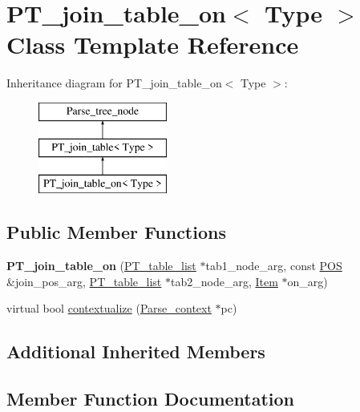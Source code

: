 \hypertarget{classPT__join__table__on}{}\section{P\+T\+\_\+join\+\_\+table\+\_\+on$<$ Type $>$ Class Template Reference}
\label{classPT__join__table__on}
Inheritance diagram for P\+T\+\_\+join\+\_\+table\+\_\+on$<$ Type $>$\+:\begin{figure}[H]
\begin{center}
\leavevmode
\includegraphics[height=3.000000cm]{classPT__join__table__on}
\end{center}
\end{figure}
\subsection*{Public Member Functions}
\begin{DoxyCompactItemize}
\item 
\mbox{\label{classPT__join__table__on_aaaebb97eb3a2056a2858503e91031c96}} 
{\bfseries P\+T\+\_\+join\+\_\+table\+\_\+on} (\mbox{\hyperlink{classPT__table__list}{P\+T\+\_\+table\+\_\+list}} $\ast$tab1\+\_\+node\+\_\+arg, const \mbox{\hyperlink{structYYLTYPE}{P\+OS}} \&join\+\_\+pos\+\_\+arg, \mbox{\hyperlink{classPT__table__list}{P\+T\+\_\+table\+\_\+list}} $\ast$tab2\+\_\+node\+\_\+arg, \mbox{\hyperlink{classItem}{Item}} $\ast$on\+\_\+arg)
\item 
virtual bool \mbox{\hyperlink{classPT__join__table__on_a5d8bc49cbc77e4bd9c7ea3ae05c624dd}{contextualize}} (\mbox{\hyperlink{structParse__context}{Parse\+\_\+context}} $\ast$pc)
\end{DoxyCompactItemize}
\subsection*{Additional Inherited Members}


\subsection{Member Function Documentation}
\mbox{\label{classPT__join__table__on_a5d8bc49cbc77e4bd9c7ea3ae05c624dd}} 
